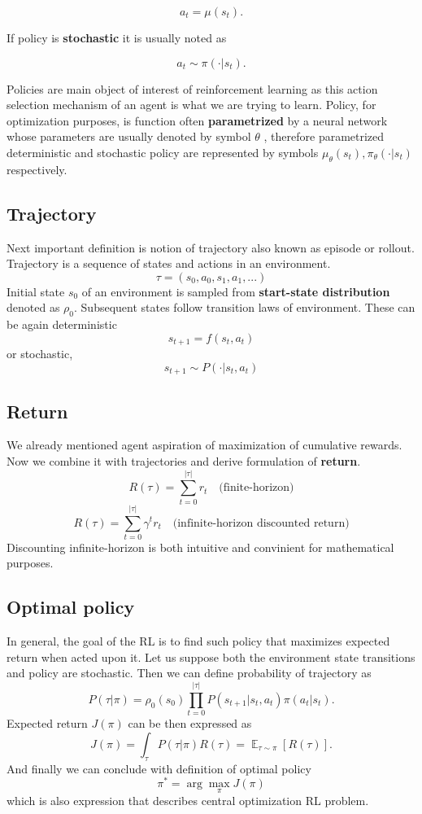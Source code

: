$$
a_t = \mu(s_t).
$$

If policy is \textbf{stochastic} it is usually noted as 

$$a_t \sim \pi(\cdot |s_t).$$

Policies are main object of interest of reinforcement learning as this action selection mechanism of an agent is what we are trying to learn.
Policy, for optimization purposes, is function often \textbf{parametrized} by a neural network whose parameters are usually denoted by symbol
$
    \theta
$
, therefore parametrized deterministic and stochastic policy are represented by symbols     $\mu_\theta(s_t) , \pi_\theta(\cdot |s_t)$ respectively.

\subsection*{Trajectory}
Next important definition is notion of trajectory also known as episode or rollout.
Trajectory is a sequence of states and actions in an environment.
$$\tau = (s_0, a_0, s_1, a_1, ...)$$
Initial state $s_0$ of an environment is sampled from \textbf{start-state distribution} denoted as $\rho_0$. 
Subsequent states follow transition laws of environment. 
These can be again deterministic 
$$s_{t+1} = f(s_t, a_t)$$ or stochastic,
$$s_{t+1} \sim P(\cdot | s_t, a_t)$$

\subsection*{Return}
We already mentioned agent aspiration of maximization of cumulative rewards.
Now we combine it with trajectories and derive formulation of \textbf{return}.
$$R(\tau) = \sum_{t=0}^{|\tau|}r_t \quad \textrm{(finite-horizon)} $$
$$R(\tau) = \sum_{t=0}^{|\tau|}\gamma^t r_t \quad \textrm{(infinite-horizon discounted return)}$$
Discounting infinite-horizon is both intuitive and convinient for mathematical purposes.



\subsection*{Optimal policy}
In general, the goal of the RL is to find such policy that maximizes expected return when acted upon it.
Let us suppose both the environment state transitions and policy are stochastic. 
Then we can define probability of trajectory as
$$P(\tau|\pi) = \rho_0(s_0) \prod_{t=0}^{|\tau|} P(s_{t+1}|s_t,a_t)\pi(a_t|s_t).$$
Expected return $J(\pi)$ can be then expressed as
$$J(\pi)=\int_\tau P(\tau|\pi)R(\tau)= \mathop{\mathbb{E}}_{\tau \sim \pi}[R(\tau)].$$
And finally we can conclude with definition of optimal policy 
$$\pi^* = \arg \max_\pi J(\pi)$$
which is also expression that describes central optimization RL problem.

